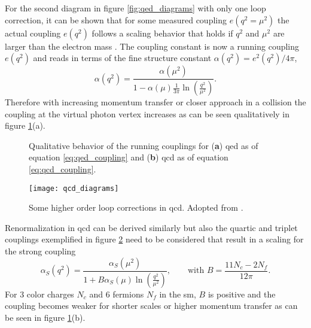 For the second diagram in figure \ref{fig:qed_diagrams} with only one loop correction, it can be shown that for some measured coupling $e(q^2=\mu^2)$ the actual coupling $e(q^2)$ follows a scaling behavior that holds if $q^2$ and $\mu^2$ are larger than the electron mass \citep{thomson2013modern}. The coupling constant is now a running coupling $e(q^2)$ and reads in terms of the fine structure constant $\alpha(q^2)=e^2(q^2)/4\pi$,
\begin{equation}
    \alpha(q^2)=
    \frac{\alpha(\mu^2)}
    {1-\alpha(\mu)\frac{1}{3\pi}
        \ln
        \left(\frac{q^2}{\mu^2}\right)}.
    \label{eq:qed_coupling}
\end{equation}
Therefore with increasing momentum transfer or closer approach in a collision the coupling at the virtual photon vertex increases as can be seen qualitatively in figure \ref{fig:renorm_scaling}(a).
\begin{figure}
    \centering
    \caption[]{Qualitative behavior of the running couplings for (\textbf{a}) \ac{qed} as of equation \ref{eq:qed_coupling} and (\textbf{b}) \ac{qcd} as of equation \ref{eq:qcd_coupling}.}
    \label{fig:renorm_scaling}
\end{figure}
\begin{figure}[H]
    \centering
    \texttt{[image: qcd\_diagrams]}
    \caption[]{Some higher order loop corrections in \ac{qcd}. Adopted from \citep{thomson2013modern}.}
    \label{fig:qcd_diagrams}
\end{figure}
Renormalization in \ac{qcd} can be derived similarly but also the quartic and triplet couplings exemplified in figure \ref{fig:qcd_diagrams} need to be considered that result in a scaling for the strong coupling
\begin{equation}
    \alpha_S(q^2)=
    \frac{\alpha_S(\mu^2)}
    {1+B\alpha_S(\mu)
        \ln
        \left(\frac{q^2}{\mu^2}\right)}, \qquad \text{with } B=\frac{11N_c-2N_f}{12\pi}.
    \label{eq:qcd_coupling}
\end{equation}
For 3 color charges $N_c$ and 6 fermions $N_f$ in the \ac{sm}, $B$ is positive and the coupling becomes weaker for shorter scales or higher momentum transfer as can be seen in figure \ref{fig:renorm_scaling}(b).

